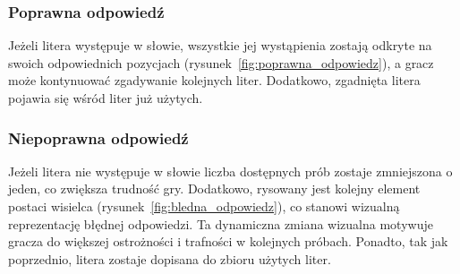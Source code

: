 \documentclass[]{report}
\begin{document}
\subsubsection*{Poprawna odpowiedź}

Jeżeli litera występuje w słowie, wszystkie jej wystąpienia zostają odkryte na swoich odpowiednich pozycjach (rysunek~\ref{fig:poprawna_odpowiedz}), a gracz może kontynuować zgadywanie kolejnych liter. Dodatkowo, zgadnięta litera pojawia się wśród liter już użytych.

\subsubsection*{Niepoprawna odpowiedź}

Jeżeli litera nie występuje w słowie liczba dostępnych prób zostaje zmniejszona o jeden, co zwiększa trudność gry. Dodatkowo, rysowany jest kolejny element postaci wisielca (rysunek~\ref{fig:bledna_odpowiedz}), co stanowi wizualną reprezentację błędnej odpowiedzi. Ta dynamiczna zmiana wizualna motywuje gracza do większej ostrożności i trafności w kolejnych próbach. Ponadto, tak jak poprzednio, litera zostaje dopisana do zbioru użytych liter.

\vspace{0.5cm}
\end{document}
